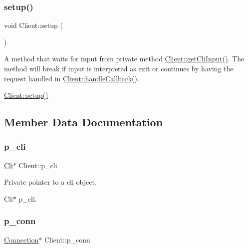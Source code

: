 \subsubsection{\texorpdfstring{setup()}{setup()}}
{\footnotesize\ttfamily void Client\+::setup (\begin{DoxyParamCaption}{ }\end{DoxyParamCaption})}



A method that waits for input from private method \hyperlink{classClient_a62807c316030505b03b90186d3b06a25}{Client\+::get\+Cli\+Input()}. The method will break if input is interpreted as exit or continues by having the request handled in \hyperlink{classClient_a12334d98c376fbdf577d1dfa6bf9a4c0}{Client\+::handle\+Callback()}. 

\hyperlink{classClient_a33b0b1f7391689c68fa125549e8c5dcc}{Client\+::setup()} 

\subsection{Member Data Documentation}
\mbox{\label{classClient_a48826e6a4fbfb261da3782405cd2558e}} 
\subsubsection{\texorpdfstring{p\+\_\+cli}{p\_cli}}
{\footnotesize\ttfamily \hyperlink{classCli}{Cli}$\ast$ Client\+::p\+\_\+cli\hspace{0.3cm}{\ttfamily [private]}}



Private pointer to a cli object. 

Cli$\ast$ p\+\_\+cli. \mbox{\label{classClient_a086555f6a435428891d5f237cd454c88}} 
\subsubsection{\texorpdfstring{p\+\_\+conn}{p\_conn}}
{\footnotesize\ttfamily \hyperlink{classConnection}{Connection}$\ast$ Client\+::p\+\_\+conn\hspace{0.3cm}{\ttfamily [private]}}



